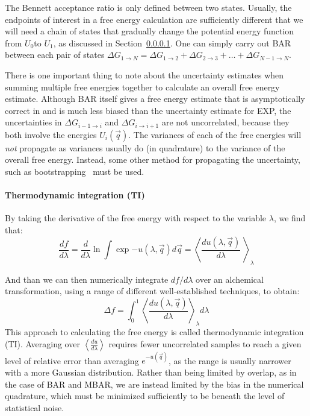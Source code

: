 \documentclass[9pt,bestpractices]{livecoms}
\newcommand{\expect}[1]{\left\langle{#1}\right\rangle}
\begin{document}
The Bennett acceptance ratio is only defined between two states.  Usually, the endpoints of interest in a free energy calculation are sufficiently different that we will need a chain of states that gradually change the potential energy function from $U_0$to $U_1$, as discussed in Section~\ref{}. One can simply carry out BAR between each pair of states $\Delta G_{1 \rightarrow N} = \Delta {G_{1\rightarrow 2}} + \Delta {G_{2\rightarrow 3}} +  \ldots + \Delta G_{N-1\rightarrow N}$.

There is one important thing to note about the uncertainty estimates when summing multiple free energies together to calculate an overall free energy estimate.  Although BAR itself gives a free energy estimate that is asymptotically correct in and is much less biased than the uncertainty estimate for EXP, the uncertainties in $\Delta {G_{i-1\rightarrow i}}$ and $\Delta {G_{i\rightarrow i+1}}$ are not uncorrelated, because they both involve the energies $U_i(\vec{q})$. The variances of each of the free energies will \textit{not} propagate as variances usually do (in quadrature) to the variance of the overall free energy. Instead, some other method for propagating the uncertainty, such as bootstrapping~\cite{Grossfield:L:2018} must be used.

\paragraph{Thermodynamic integration (TI)}

By taking the derivative of the free energy with respect to the
variable $\lambda$, we find that:
\begin{equation}
\frac{df}{d\lambda} = \frac{d}{d\lambda} \ln \int \exp{-u(\lambda,\vec{q})} d\vec{q} = \expect{\frac{du(\lambda,\vec{q})}{d\lambda}\
}_{\lambda} 
\end{equation}

And than we can then numerically integrate $df/d\lambda$ over an alchemical transformation, using a range of different well-established techniques, to obtain:
\begin{equation}
\Delta f    = \int_{0}^{1} \expect{\frac{du(\lambda,\vec{q})}{d\lambda}}_{\lambda}  d\lambda    
\end{equation}
This approach to calculating the free energy is called thermodynamic integration (TI). Averaging over $\expect{\frac{du}{d\lambda}}$ requires
fewer uncorrelated samples to reach a given level of relative error
than averaging $e^{-u(\vec{q})}$, as the range is usually
narrower with a more Gaussian distribution. Rather than being limited by overlap, as in the case of BAR and MBAR, we are instead limited by the bias in the numerical quadrature, which must be minimized sufficiently to be beneath the level of statistical noise.
\end{document}

